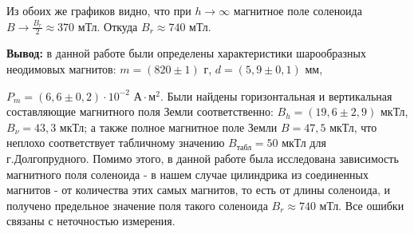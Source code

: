 \documentclass[a4paper,12pt]{article} %
\begin{document}
Из обоих же графиков видно, что при $h \longrightarrow \infty$ магнитное поле соленоида $B \longrightarrow \frac{B_r}{2} \approx 370$ мТл. Откуда $B_r \approx 740$ мТл.

\vspace{30mm}

\textbf{{\normalsize Вывод:}} в данной работе были определены характеристики шарообразных неодимовых магнитов: $m = (820 \pm 1)$ г, $d = (5,9 \pm 0,1)$ мм, 

\noindent $P_m = (6,6 \pm 0,2) \cdot 10^{-2} \text{ А} \cdot \text{м}^2$. Были найдены горизонтальная и вертикальная составляющие магнитного поля Земли соответственно: $B_h = (19,6 \pm 2,9)$ мкТл, $B_{\nu} = 43,3$ мкТл; а также полное магнитное поле Земли $B = 47,5$ мкТл, что неплохо соответствует табличному значению $B_{\text{табл}} = 50$ мкТл для г.Долгопрудного. Помимо этого, в данной работе была исследована зависимость магнитного поля соленоида - в нашем случае цилиндрика из соединенных магнитов - от количества этих самых магнитов, то есть от длины соленоида, и получено предельное значение поля такого соленоида $B_r \approx 740$ мТл. Все ошибки связаны с неточностью измерения.
\end{document}
